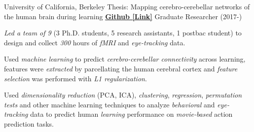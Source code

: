 

\begin{cventries}

  \cventry
    {University of California, Berkeley} %
    {Thesis: Mapping cerebro-cerebellar networks of the human brain during learning}
    {\href{https://github.com/maedbhk/cerebellum_learning_connect}{\textbf{Github [Link]}}}
    {Graduate Researcher (2017-)} %
    {
      \begin{cvitems} %
        \item {\textit{Led a team of 9} (3 Ph.D. students, 5 research assistants, 1 postbac student) to design and collect \textit{300} hours of \textit{fMRI} and \textit{eye-tracking} data.}
        \item {Used \textit{machine learning} to predict \textit{cerebro-cerebellar connectivity} across learning, features were \textit{extracted} by parcellating the human cerebral cortex and \textit{feature selection} was performed with \textit{L1 regularization}.}
        \item {Used \textit{dimensionality reduction} (PCA, ICA), \textit{clustering}, \textit{regression}, \textit{permutation tests} and other machine learning techniques to analyze \textit{behavioral} and \textit{eye-tracking} data to predict human \textit{learning} performance on \textit{movie-based} action prediction tasks.}
      \end{cvitems}
    }
    

\end{cventries}
